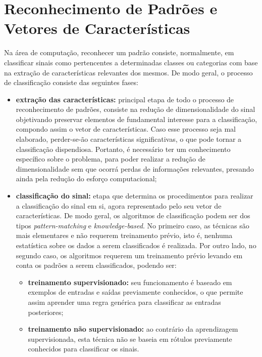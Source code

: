 \documentclass[a4paper,12pt,twoside,openright]{report}
\begin{document}
\section{Reconhecimento de Padr\~{o}es e Vetores de Caracter\'{i}sticas}
\label{reconhecimento_padroes_vetores_caracteristicas}
\par Na \'{a}rea de computa\c{c}\~{a}o, reconhecer um padr\~{a}o consiste, normalmente, em classificar sinais como pertencentes a determinadas classes ou categorias com base na extra{\c c}\~{a}o de caracter\'{i}sticas relevantes dos mesmos. De modo geral, o processo de classifica\c{c}\~{a}o consiste das seguintes fases: 
\begin{itemize}
\item{}\textbf{extra{\c c}\~{a}o das caracter\'{i}sticas:} principal etapa de todo o processo de reconhecimento de padr\~{o}es, consiste na redu{\c c}\~{a}o de dimensionalidade do sinal objetivando preservar elementos de fundamental interesse para a classifica\c{c}\~{a}o, compondo assim o vetor de caracter\'{i}sticas. Caso esse processo seja mal elaborado,  perder-se-\~{a}o caracter\'{i}sticas significativas, o que pode tornar a classifica{\c c}\~{a}o dispendiosa. Portanto, \'{e} necess\'{a}rio ter um conhecimento espec\'{i}fico sobre o problema, para poder realizar a redu{\c c}\~{a}o de dimensionalidade sem que ocorr\'{a} perdas de informa{\c c}\~{o}es relevantes, presando ainda pela redu\c{c}\~{a}o do esfor{\c c}o computacional;
\item{}\textbf{classifica{\c c}\~{a}o do sinal:} etapa que determina os procedimentos para realizar a classifica{\c c}\~{a}o do sinal em si, agora representado pelo seu vetor de caracter\'{i}sticas. De modo geral, os algoritmos de classifica\c{c}\~{a}o podem ser dos tipos \textit{pattern-matching} e \textit{knowledge-based}. No primeiro caso, as t\'{e}cnicas s\~{a}o mais elementares e n\~{a}o requerem treinamento pr\'{e}vio, isto \'{e}, nenhuma estat\'{i}stica sobre os dados a serem classificados \'{e} realizada. Por outro lado, no segundo caso, os algoritmos requerem um treinamento pr\'{e}vio levando em conta os padr\~{o}es a serem classificados, podendo ser:
		\begin{itemize}
		\item{}\textbf{treinamento supervisionado:} seu funcionamento \'{e} baseado em exemplos de entradas e sa\'{i}das previamente conhecidos, o que permite assim aprender uma regra gen\'{e}rica para classificar as entradas posteriores;
		\item \textbf{treinamento n\~{a}o supervisionado:} ao contr\'{a}rio da aprendizagem supervisionada, esta t\'{e}cnica n\~{a}o se baseia em r\'{o}tulos previamente conhecidos para classificar os sinais.
		\end{itemize}
\end{itemize}
\end{document}
